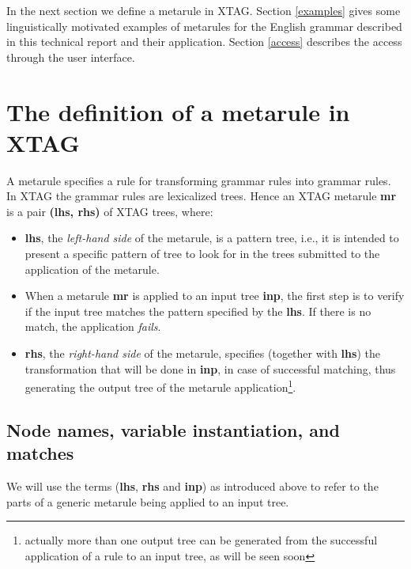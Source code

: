 In the next section we define a metarule in XTAG. 
Section \ref{examples} gives some
linguistically motivated examples
of metarules for the English grammar described in this
technical report and their application. Section \ref{access} 
describes the access through 
the user interface.

\section{The definition of a metarule in XTAG}
\label{definition}

A metarule specifies a rule for transforming grammar rules into grammar rules. 
In XTAG the grammar 
rules are lexicalized trees. Hence an XTAG metarule {\bf mr} 
is a pair {\bf (lhs, rhs)} of XTAG trees, where:

\begin{itemize}
\item {\bf lhs}, the {\it left-hand side} of the metarule, is a pattern tree,
        i.e., it is intended to present a specific pattern of tree to look for
        in the trees submitted to the application of the metarule.

\item When a metarule {\bf mr} is applied to an input tree {\bf inp}, the first
        step is to verify if the input tree matches the pattern specified by
        the {\bf lhs}. If there is no match, the application {\it fails}.

\item {\bf rhs}, the {\it right-hand side} of the metarule, specifies (together
        with {\bf lhs}) the transformation that will be done in {\bf inp},
        in case of successful matching, thus generating the output tree of
        the metarule application\footnote{actually more than one output tree 
        can be generated from the successful application of a rule to an 
        input tree, as will be seen soon}.
\end{itemize}
 
\subsection{Node names, variable instantiation, and matches}

We will use the terms ({\bf lhs}, {\bf rhs} and {\bf inp}) as introduced above
to refer to the parts of a generic metarule being applied to an input tree. 

